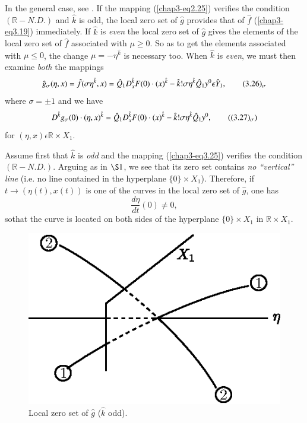 In the general case, see \cite{31}. If the mapping (\ref{chap3-eq2.25})
verifies the condition $(\mathbb{R}-N.D.)$ and $\hat{k}$ is odd, the
local zero set of $\hat{g}$ provides that of $\hat{f}$
(\ref{chap3-eq3.19}) immediately. If $\hat{k}$ is {\em even} the local
zero set of $\hat{g}$ gives the elements of the local zero set of
$\hat{f}$ associated with $\mu \geq 0$. So as to get the elements
associated with $\mu \leq 0$, the change $\mu = -\eta^{\hat{k}}$ is
necessary too. When $\hat{k}$ is {\em even}, we must then examine {\em
both} the mappings
\begin{equation*}
\hat{g}_{\sigma}(\eta, x) = \hat{f}(\sigma \eta^{\hat{k}}, x) =
\hat{Q}_{1}D_{x}^{\hat{k}}F(0) \cdot (x)^{\hat{k}} - \hat{k}!\sigma
\eta^{\hat{k}} \hat{Q}_{1} y^{0} \epsilon \hat{Y}_{1},\tag*{(3.26)$_{\sigma}$}\label{chap3-eq3.26}
\end{equation*}
where $\sigma = \pm 1$ and we have
\begin{equation*}
D^{\hat{k}}g_{\sigma}(0) \cdot (\eta, x)^{\hat{k}} =
\hat{Q}_{1}D_{x}^{\hat{k}}F(0) \cdot (x)^{\hat{k}} - \hat{k}!\sigma
\eta^{\hat{k}} \hat{Q}_{1}y^{0},\tag{(3.27)$_{\sigma}$}\label{chap3-eq3.27}
\end{equation*}
for $(\eta, x) \epsilon \mathbb{R} \times X_{1}$.

Assume first that $\hat{k}$ is {\em odd} and the mapping
(\ref{chap3-eq3.25}) verifies the condition
$(\mathbb{R}-N.D.)$. Arguing as in $\S 1$, we see that its zero set
contains {\em no ``vertical'' line} (i.e. no line contained in the
hyperplane $\{0\} \times X_{1}$). Therefore, if $t \to (\eta(t),
x(t))$ is one of the curves in the local zero set of $\hat{g}$, one
has
$$
\frac{d\eta}{dt}(0) \neq 0,
$$
so\pageoriginale that the curve is located on both sides of the
hyperplane $\{0\} \times X_{1}$ in $\mathbb{R} \times X_{1}$.
\setcounter{figure}{0}
\begin{figure}[H]
\centering
\includegraphics{figure/fig76-3.1_1.eps}
\caption{Local zero set of $\hat{g}$ ($\hat{k}$ odd).}
\end{figure}


